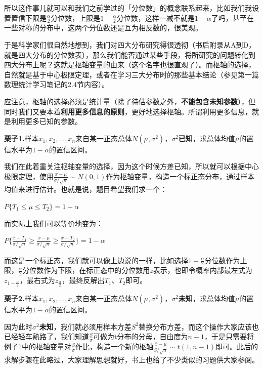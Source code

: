 \documentclass[10pt, a4paper]{article}
\begin{document}
所以这件事儿就可以和我们之前学过的「分位数」的概念联系起来，比如我们我设置置信下限是$\frac{\alpha}{2}$分位数，上限是$1-\frac{\alpha}{2}$分位数，这样一减不就是$1-\alpha$了吗，甚至在一些对称的分布中，这两个分位数还是互为相反数的，很美观。\par
于是科学家们很自然地想到，我们对四大分布研究得很透彻（书后附录从A到D，就是四大分布的分位数表），那么我们能否通过某些手段，将所研究的问题转化到四大分布上呢？这就是枢轴变量的由来（这个名字也很直观了）。而枢轴的选择，自然就是基于中心极限定理，或者在学习三大分布时的那些基本结论（参见第一篇数理统计学习笔记的2.4节内容）。\par
应注意，枢轴的选择必须是统计量（除了待估参数之外，\textbf{不能包含未知参数}），但同时我们又要本着\textbf{利用更多信息的原则}，更好地选择枢轴。所谓利用更多信息，就是利用更多已知的参数。\\\par
\textbf{栗子1.}样本$x_1,x_2,\dots,x_n$来自某一正态总体$N(\mu,\sigma^2)$，$\sigma^2$\textbf{已知}，求总体均值$\mu$的置信水平为$1-\alpha$的置信区间。\par
我们在此着重关注枢轴变量的选择，因为这个时候方差已知，所以就可以根据中心极限定理，使用$\frac{\bar{x}-\mu}{\sigma / \sqrt{n}} \sim N(0,1)$作为枢轴变量，构造一个标正态分布，通过样本均值来进行估计。也就是说，题目希望我们求一个：
\begin{center}
    $P\{T_{1} \leqslant \mu \leqslant T_{2}\} = 1-\alpha$
\end{center}
而实际上我们可以等价地变为：
\begin{center}
    $P\{\frac{\bar{x}-T_{1}}{\sigma / \sqrt{n}} \geqslant \frac{\bar{x}-\mu}{\sigma / \sqrt{n}} \geqslant \frac{\bar{x}-T_{2}}{\sigma / \sqrt{n}}\} = 1-\alpha$
\end{center} \par
而这是一个标正态，我们就可以像上边说的一样，比如选择$1-\frac{\alpha}{2}$分位数作为上限，$\frac{\alpha}{2}$分位数作为下限，在标正态中的分位数用$z$表示，也即令概率内部最左式为$z_{1-\frac{\alpha}{2}}$，最右式为$z_{\frac{\alpha}{2}}$，最终反解出$T_1$、$T_2$即可。\\\par
\textbf{栗子2.}样本$x_1,x_2,\dots,x_n$来自某一正态总体$N(\mu,\sigma^2)$，$\sigma^2$\textbf{未知}，求总体均值$\mu$的置信水平为$1-\alpha$的置信区间。\par
因为此时$\sigma^2$\textbf{未知}，我们就必须用样本方差$S^2$替换分布方差，而这个操作大家应该也已经轻车熟路了，我们知道$\frac{S}{\sigma}$可做为t分布的分母，自由度为$n-1$，于是只需要将例子1中的枢轴变量对$\frac{S}{\sigma}$作比，构造一个新的枢轴$\frac{\bar{x}-\mu}{S / \sqrt{n}} \sim t(1,n-1)$即可。此后的求解步骤在此略过，大家理解思想就好，书上也给了不少类似的习题供大家参阅。\\\par
\end{document}
